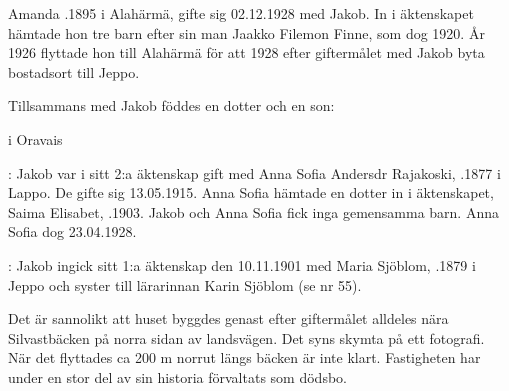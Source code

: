 Amanda .1895 i Alahärmä, gifte sig 02.12.1928 med Jakob. In i äktenskapet hämtade hon tre barn efter sin man Jaakko Filemon Finne, som dog 1920. År 1926 flyttade hon till Alahärmä för att 1928 efter giftermålet med Jakob byta bostadsort till Jeppo.
\begin{jhchildren}
  \item {}
  \item {}
  \item {}
\end{jhchildren}
Tillsammans med Jakob föddes en dotter och en son:
  \begin{jhchildren}
    \item {} i Oravais
    \item {}
\end{jhchildren}


:
Jakob var i sitt 2:a äktenskap gift  med Anna Sofia Andersdr Rajakoski, .1877 i Lappo. De gifte sig 13.05.1915. Anna Sofia hämtade en dotter in i äktenskapet, Saima Elisabet, .1903. Jakob och Anna Sofia fick inga gemensamma barn. Anna Sofia dog  23.04.1928.

:
Jakob ingick sitt 1:a äktenskap den 10.11.1901 med Maria Sjöblom, .1879 i Jeppo och syster till lärarinnan Karin Sjöblom (se nr 55).
\begin{jhchildren}
  \item {}
  \item {}
  \item {}
  \item {}
  \item {}
\end{jhchildren}
Det är sannolikt att huset byggdes genast efter giftermålet alldeles nära Silvastbäcken på norra sidan av landsvägen. Det syns skymta på ett fotografi. När det flyttades ca 200 m norrut längs bäcken är inte klart. Fastigheten har under en stor del av sin historia förvaltats som dödsbo.



